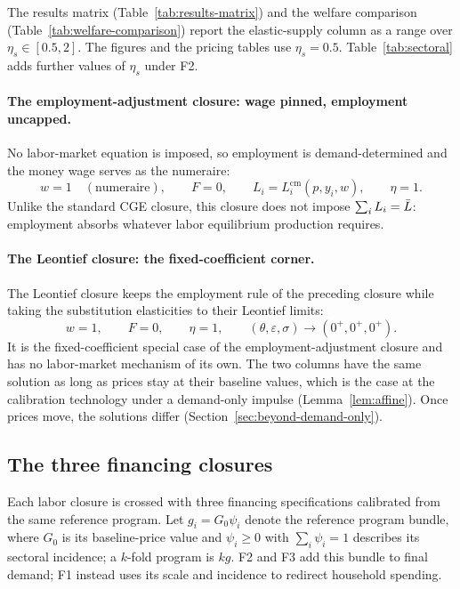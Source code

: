 The results matrix (Table~\ref{tab:results-matrix}) and the welfare comparison (Table~\ref{tab:welfare-comparison}) report the elastic-supply column as a range over $\eta_s \in [0.5, 2]$. The figures and the pricing tables use $\eta_s = 0.5$. Table~\ref{tab:sectoral} adds further values of $\eta_s$ under F2.

\paragraph{The employment-adjustment closure: wage pinned, employment uncapped.}
No labor-market equation is imposed, so employment is demand-determined and the money wage serves as the numeraire:
\begin{equation}
w = 1 \quad(\text{numeraire}),
\qquad F = 0,
\qquad L_i = L_i^{\mathrm{cm}}(p,y_i,w),
\qquad \eta = 1 .
\label{eq:closure-gamma}
\end{equation}
Unlike the standard CGE closure, this closure does not impose $\sum_i L_i = \bar{L}$: employment absorbs whatever labor equilibrium production requires.

\paragraph{The Leontief closure: the fixed-coefficient corner.}
The Leontief closure keeps the employment rule of the preceding closure while taking the substitution elasticities to their Leontief limits:
\begin{equation}
w = 1, \qquad F = 0, \qquad \eta = 1,
\qquad (\theta,\varepsilon,\sigma) \longrightarrow (0^+,0^+,0^+).
\label{eq:closure-delta}
\end{equation}
It is the fixed-coefficient special case of the employment-adjustment closure and has no labor-market mechanism of its own. The two columns have the same solution as long as prices stay at their baseline values, which is the case at the calibration technology under a demand-only impulse (Lemma~\ref{lem:affine}). Once prices move, the solutions differ (Section~\ref{sec:beyond-demand-only}).

\subsection{The three financing closures}\label{app:financing-closures}

Each labor closure is crossed with three financing specifications calibrated from the same reference program. Let $g_i = G_0\psi_i$ denote the reference program bundle, where $G_0$ is its baseline-price value and $\psi_i \geq 0$ with $\sum_i\psi_i = 1$ describes its sectoral incidence; a $k$-fold program is $kg$. F2 and F3 add this bundle to final demand; F1 instead uses its scale and incidence to redirect household spending.

